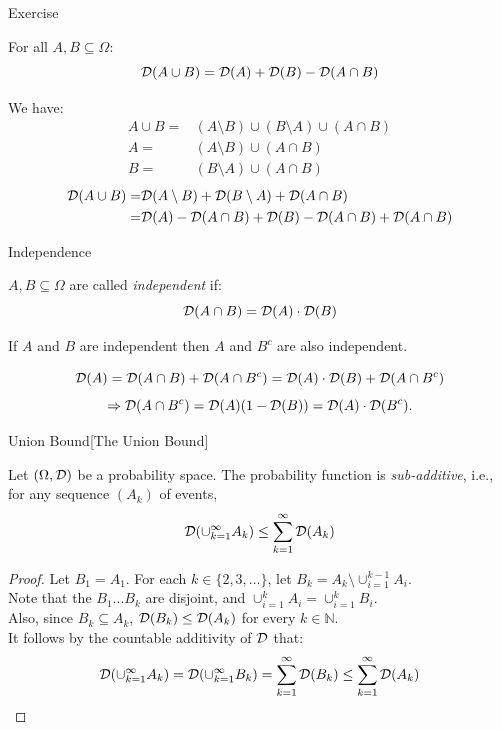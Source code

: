 \documentclass[11pt, usenames, dvipsnames]{beamer}
\begin{document}
\begingroup
\small%
\begin{frame}{Exercise}

\begin{exercise}
For all $A,B\subseteq\Omega$: $$\mathcal{D}(A\cup B)=\mathcal{D}(A)+\mathcal{D}(B)-\mathcal{D}(A\cap B)$$
\end{exercise}
\pause
\begin{solution}
We have:
\begin{align*}
    A\cup B=&(A\setminus B)\cup(B\setminus A)\cup(A\cap B)\\
    A=&(A\setminus B)\cup(A\cap B) \\
    B=&(B\setminus A)\cup(A\cap B)
\end{align*}
\pause
\begin{align*}
    \mathcal{D}(A\cup B)= & \mathcal{D}(A\setminus B)+\mathcal{D}(B\setminus A)+\mathcal{D}(A\cap B)\\
    =&\mathcal{D}(A)-\mathcal{D}(A\cap B)+\mathcal{D}(B)-\mathcal{D}(A\cap B)+\mathcal{D}(A\cap B)    
\end{align*}
\end{solution}
\end{frame}
\endgroup
\begin{frame}{Independence}
\begin{definition}[Independence]
$A,B\subseteq\Omega$ are called \emph{independent} if: $$\mathcal{D}(A\cap B) =\mathcal{D}(A)\cdot\mathcal{D}(B)$$
\end{definition}
\pause
\begin{exercise}
If $A$ and $B$ are independent then $A$ and $B^c$ are also independent. 
\end{exercise}
\pause
\begin{solution}
$$\mathcal{D}(A)=\mathcal{D}(A\cap B)+\mathcal{D}(A\cap B^c)=\mathcal{D}(A)\cdot\mathcal{D}(B)+\mathcal{D}(A\cap B^c)$$ 
\pause
$$\Rightarrow\mathcal{D}(A\cap B^c)=\mathcal{D}(A)(1-\mathcal{D}(B))=\mathcal{D}(A)\cdot\mathcal{D}(B^c).$$
\end{solution}
\end{frame}

\begingroup
\footnotesize%
\begin{frame}{Union Bound}[The Union Bound]
\begin{lemma}  \label{lem:unionBound} Let
$(\Omega, \mathcal{D})$ be a probability space. The probability function is \emph{sub-additive}, i.e., for any sequence $(A_k)$ of events,
$$\mathcal{D}(\cup_{k=1}^\infty A_k) \le \sum_{k=1} ^\infty \mathcal{D}(A_k)$$
\end{lemma}
\pause
\begin{proof}
Let $B_1=A_1$. For each $k \in \{2,3,\ldots\}$, let $B_k = A_k
\setminus \cup_{i=1}^{k-1} A_i$. \\
\pause
Note that the $B_1...B_k$ are disjoint, and $\cup_{i=1}^k A_i=\cup_{i=1}^k B_i$. \\
\pause
Also, since $B_k\subseteq A_k$, $\mathcal{D}(B_k) \le \mathcal{D}(A_k)$ for every $k \in \mathbb{N}$.\\
\pause
It follows by the countable additivity of $\mathcal{D}$ that:
$$\mathcal{D}(\cup_{k=1}^\infty A_k) = \mathcal{D}(\cup_{k=1}^\infty B_k) = \sum_{k=1}
^\infty \mathcal{D}(B_k) \le \sum_{k=1}
^\infty \mathcal{D}(A_k) 
$$
\end{proof} 
\end{frame}
\endgroup
\end{document}
